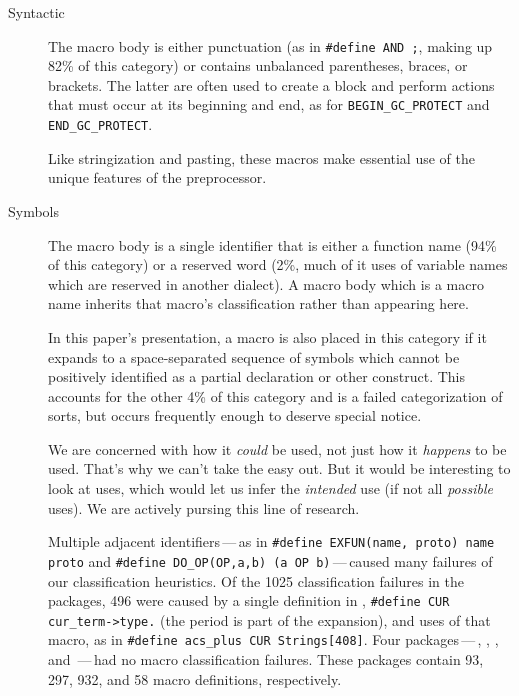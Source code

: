 \begin{description}
\item[Syntactic]  The macro body is either punctuation (as in
  {\tt \#define AND ;}, making up 82\% of this category) or contains
  unbalanced parentheses, braces, or brackets.  The latter are often used
  to create a block and perform actions that must occur at its beginning
  and end, as for \verb|BEGIN_GC_PROTECT| and \verb|END_GC_PROTECT|.
  
  Like stringization and pasting, these macros make essential use of the
  unique features of the preprocessor.


\item[Symbols]
  The macro body is a single identifier that is either a function name
  (94\% of this category) or a reserved word (2\%, much of it uses of
  variable names which are reserved in another dialect).  A macro body
  which is a macro name inherits that macro's classification rather than
  appearing here.
  
  In this paper's presentation, a macro is also placed in this category if
  it expands to a space-separated sequence of symbols which cannot be
  positively identified as a partial declaration or other construct.  This
  accounts for the other 4\% of this category and is a failed
  categorization of sorts, but occurs frequently enough to deserve special
  notice.

  We are concerned with how it {\em could} be used, not just how it {\em
  happens} to be used.  That's why we can't take the easy out.  But it
  would be interesting to look at uses, which would let us infer the {\em
  intended} use (if not all {\em possible} uses).  We are actively pursing
  this line of research.

  Multiple adjacent identifiers\,---\,as in
  {\tt \#define EXFUN(name, proto) name proto} and {\tt \#define
  \verb|DO_OP|(OP,a,b) (a OP b)}\,---\,caused many failures of our
  classification heuristics.  Of the 1025 classification failures in the
  {\numpackages} packages, 496 were caused by a single definition in
  , {\tt \#define CUR \verb|cur_term->type.|} (the period is
  part of the expansion), and uses of that macro, as in {\tt \#define
  \verb|acs_plus| CUR Strings[408]}.  Four packages\,---\,,
  , , and \,---\,had no macro
  classification failures.  These packages contain 93, 297, 932, and 58 macro
  definitions, respectively.





\end{description}
